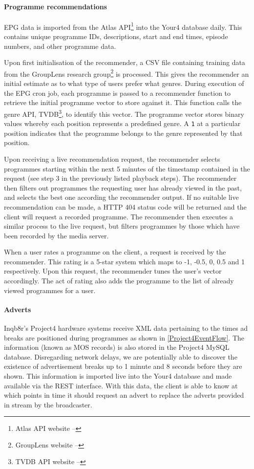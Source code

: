 \paragraph{Programme recommendations}

EPG data is imported from the Atlas API\footnote{Atlas API website -- } into the Your4 database daily. This contains unique programme IDs, descriptions, start and end times, episode numbers, and other programme data.

Upon first initialisation of the recommender, a CSV file containing training data from the GroupLens research group\footnote{GroupLens website -- } is processed. This gives the recommender an initial estimate as to what type of users prefer what genres. During execution of the EPG cron job, each programme is passed to a recommender function to retrieve the initial programme vector to store against it. This function calls the genre API, TVDB\footnote{TVDB API website -- }, to identify this vector. The programme vector stores binary values whereby each position represents a predefined genre. A \texttt{1} at a particular position indicates that the programme belongs to the genre represented by that position.

Upon receiving a live recommendation request, the recommender selects programmes starting within the next 5 minutes of the timestamp contained in the request (see step 3 in the previously listed playback steps). The recommender then filters out programmes the requesting user has already viewed in the past, and selects the best one according the recommender output. If no suitable live recommendation can be made, a HTTP 404 status code will be returned and the client will request a recorded programme. The recommender then executes a similar process to the live request, but filters programmes by those which have been recorded by the media server.

When a user rates a programme on the client, a request is received by the recommender. This rating is a 5-star system which maps to -1, -0.5, 0, 0.5 and 1 respectively. Upon this request, the recommender tunes the user's vector accordingly. The act of rating also adds the programme to the list of already viewed programmes for a user.

\paragraph{Adverts}
\label{sec:lamp-adverts}
Inqb8r's Project4 hardware systems receive XML data pertaining to the times ad breaks are positioned during programmes as shown in \ref{Project4EventFlow}. The information (known as MOS records) is also stored in the Project4 MySQL database. Disregarding network delays, we are potentially able to discover the existence of advertisement breaks up to 1 minute and 8 seconds before they are shown. This information is imported live into the Your4 database and made available via the REST interface. With this data, the client is able to know at which points in time it should request an advert to replace the adverts provided in stream by the broadcaster.

